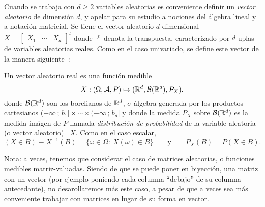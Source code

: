 Cuando se trabaja  con $d\geq 2$ variables aleatorias  es conveniente definir un
{\it vector aleatorio}  de dimensi\'on $d$, y apelar para  su estudio a nociones
del \'algebra  lineal y  a notaci\'on matricial.   Se tiene el  vector aleatorio
$d$-dimensional \ $X = \begin{bmatrix} X_1 & \cdots & X_d \end{bmatrix}^t$ donde
$\cdot^t$  denota  la  transpuesta,  caracterizado por  $d$-uplas  de  variables
aleatorias reales.   Como en  el caso  univariado, se define  este vector  de la
manera siguiente~\cite{AthLah06, Coh13, Bre88}:
%
\begin{definicion}
  Un vector aleatorio real es una funci\'on medible
  \[
  X: (\Omega,\mathcal{A},P) \mapsto (\mathbb{R}^d,\mathcal{B}(\mathbb{R}^d),P_X).
  \]
  donde  $\mathcal{B}(\mathbb{R}^d)$  son  los  borelianos  de  $\mathbb{R}^d$,  $\sigma$-\'algebra
  generada por  los productos cartesianos $(-\infty  \, ; \,  b_1] \times \cdots
  \times (-\infty \,  ; \, b_d]$ y donde la medida  $P_X$ sobre $\mathcal{B}(\mathbb{R}^d)$ es
  la medida  im\'agen de  $P$ llamada {\it  distribuci\'on de probabilidad}  de la
  variable aleatoria (o vector aleatorio) \ $X$. Como en el caso escalar,
 \[
 (X \in B) \equiv X^{-1}(B) = \{ \omega \in \Omega: \: X(\omega) \in B \} \qquad
 \mbox{y} \qquad P_X(B) = P(X \in B).
 \]
\end{definicion}
%
\noindent Nota: a veces, tenemos  que considerar el caso de matrices aleatorias,
o  funciones  medibles  matriz-valuadas.  Siendo   de  que  se  puede  poner  en
biyecci\'on,  una  matriz con  un  vector  (por  ejemplo poniendo  cada  columna
``debajo''  de su  columna antecedante),  no desarollaremos  m\'as este  caso, a
pesar de que a veces sea m\'as  conveniente trabajar con matrices en lugar de su
forma en vector.

\

